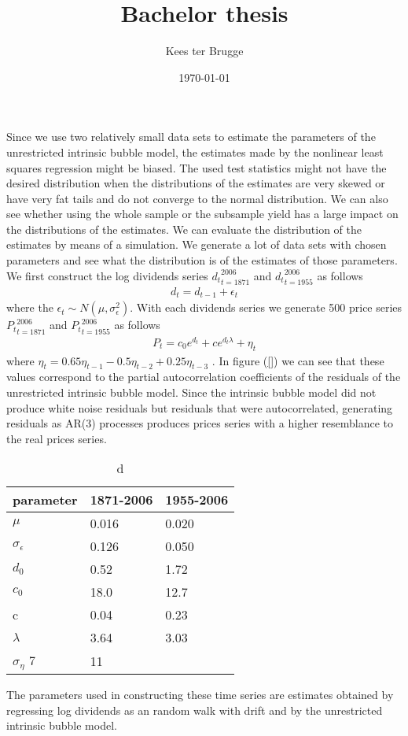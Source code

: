 \documentclass{article}
\title{Bachelor thesis}
\author{Kees ter Brugge\\}
\date{\today}
\makeatletter
\def\maketitle{%
  \null
  \thispagestyle{empty}%
  \vfill
  \begin{center}\leavevmode
    \normalfont
    {\LARGE \@title\par}%
    \vskip 1cm
    {\Large \@author\par}%
    \vskip 1cm
    {\Large \@date\par}%
  \end{center}%
  \vfill
  \null
  \cleardoublepage
  }
\makeatother
\begin{document}
 \maketitle



\newpage
Since we use two relatively small data sets to estimate the parameters of the unrestricted intrinsic bubble model, the estimates made by the nonlinear least squares regression might be biased. The used test statistics might not have the desired distribution when the distributions of the estimates are very skewed or have very fat tails and do not converge to the normal distribution. We can also see whether using the whole sample or the subsample yield has a large impact on the distributions of the estimates. We can evaluate the distribution of the estimates by means of a simulation. We generate a lot of data sets with chosen parameters and see what the distribution is of the estimates of those parameters.  \\

We first construct the log dividends series ${d_t}_{t=1871}^{2006}$ and ${d_t}_{t=1955}^{2006}$ as follows 
\begin{eqnarray}
d_t =  d_{t-1} + \epsilon_{t}
\end{eqnarray} 
where the $\epsilon_{t} \sim N(\mu, \sigma_\epsilon^2)$. With each dividends series we generate 500 price series ${P_t}_{t=1871}^{2006}$ and ${P_{t}}_{t=1955}^{2006}$ as follows
\begin{eqnarray}
P_t = c_0e^{d_t} + ce^{d_t\lambda} + \eta_t
\end{eqnarray}
where $\eta_t = 0.65 \eta_{t-1} -0.5 \eta_{t-2}+ 0.25 \eta_{t-3} $ . In figure (\ref{}) we can see that these values correspond to the partial autocorrelation coefficients of the residuals of the unrestricted intrinsic bubble model. Since the intrinsic bubble model did not produce white noise residuals but residuals that were autocorrelated, generating residuals as AR(3) processes produces prices series with a higher resemblance to the real prices series.

\begin{table}[h!]
\centering
\begin{tabular}{l|ll}   
parameter & 1871-2006 & 1955-2006 \\ \hline
$\mu$ & 0.016 & 0.020 \\
$\sigma_\epsilon$ & 0.126 & 0.050 \\
$d_0$ & 0.52& 1.72 \\
$c_0$ & 18.0 & 12.7 \\
c & 0.04 & 0.23 \\
$\lambda$ & 3.64 & 3.03 \\
$\sigma_\eta$ 7 & 11 \\  
\end{tabular}
\caption{d}
\label{d}
\end{table}
The parameters used in constructing these time series are estimates obtained by regressing log dividends as an random walk with drift and by the unrestricted intrinsic bubble model. 
 
\end{document}
